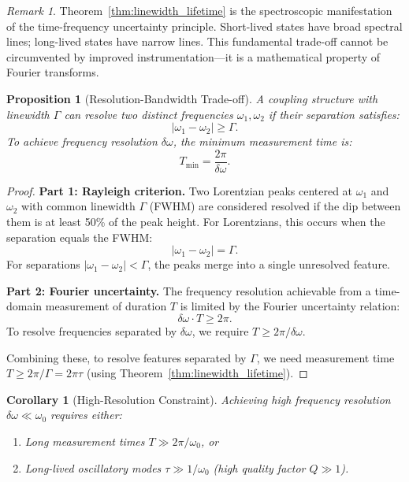\documentclass[twocolumn,10pt,a4paper]{article}
\newtheorem{corollary}[theorem]{Corollary}
\newtheorem{proposition}[theorem]{Proposition}
\theoremstyle{remark}
\newtheorem{remark}[theorem]{Remark}
\begin{document}
\begin{remark}
Theorem~\ref{thm:linewidth_lifetime} is the spectroscopic manifestation of the time-frequency uncertainty principle. Short-lived states have broad spectral lines; long-lived states have narrow lines. This fundamental trade-off cannot be circumvented by improved instrumentation—it is a mathematical property of Fourier transforms.
\end{remark}

\begin{proposition}[Resolution-Bandwidth Trade-off]
\label{prop:resolution_bandwidth}
A coupling structure with linewidth $\Gamma$ can resolve two distinct frequencies $\omega_1, \omega_2$ if their separation satisfies:
\begin{equation}
|\omega_1 - \omega_2| \geq \Gamma.
\end{equation}
To achieve frequency resolution $\delta\omega$, the minimum measurement time is:
\begin{equation}
T_{\min} = \frac{2\pi}{\delta\omega}.
\end{equation}
\end{proposition}

\begin{proof}
\textbf{Part 1: Rayleigh criterion.} Two Lorentzian peaks centered at $\omega_1$ and $\omega_2$ with common linewidth $\Gamma$ (FWHM) are considered resolved if the dip between them is at least 50\% of the peak height. For Lorentzians, this occurs when the separation equals the FWHM:
\begin{equation}
|\omega_1 - \omega_2| = \Gamma.
\end{equation}
For separations $|\omega_1 - \omega_2| < \Gamma$, the peaks merge into a single unresolved feature.

\textbf{Part 2: Fourier uncertainty.} The frequency resolution achievable from a time-domain measurement of duration $T$ is limited by the Fourier uncertainty relation:
\begin{equation}
\delta\omega \cdot T \geq 2\pi.
\end{equation}
To resolve frequencies separated by $\delta\omega$, we require $T \geq 2\pi / \delta\omega$.

Combining these, to resolve features separated by $\Gamma$, we need measurement time $T \geq 2\pi / \Gamma = 2\pi \tau$ (using Theorem~\ref{thm:linewidth_lifetime}).
\end{proof}

\begin{corollary}[High-Resolution Constraint]
\label{cor:high_resolution}
Achieving high frequency resolution $\delta\omega \ll \omega_0$ requires either:
\begin{enumerate}[label=(\roman*), noitemsep]
    \item Long measurement times $T \gg 2\pi/\omega_0$, or
    \item Long-lived oscillatory modes $\tau \gg 1/\omega_0$ (high quality factor $Q \gg 1$).
\end{enumerate}
\end{corollary}
\end{document}
